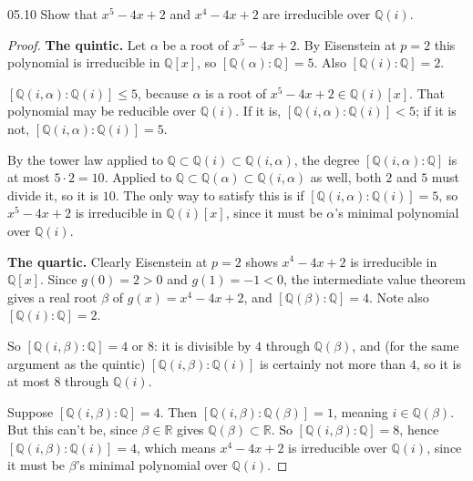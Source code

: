 \documentclass[11pt]{article}
\begin{document}
\begin{problem}{05.10}
  Show that $x^5 - 4x + 2$ and $x^4 - 4x + 2$ are irreducible over
  $\mathbb{Q}(i)$.
\end{problem}
\begin{proof}
\textbf{The quintic.} Let $\alpha$ be a root of $x^5 - 4x + 2$. By
Eisenstein at $p = 2$ this polynomial is irreducible in $\mathbb{Q}[x]$,
so $[\mathbb{Q}(\alpha) : \mathbb{Q}] = 5$. Also
$[\mathbb{Q}(i) : \mathbb{Q}] = 2$.

$[\mathbb{Q}(i,\alpha) : \mathbb{Q}(i)] \le 5$, because $\alpha$ is a root
of $x^5 - 4x + 2 \in \mathbb{Q}(i)[x]$. That polynomial may be reducible
over $\mathbb{Q}(i)$. If it is, $[\mathbb{Q}(i,\alpha) : \mathbb{Q}(i)] < 5$;
if it is not, $[\mathbb{Q}(i,\alpha) : \mathbb{Q}(i)] = 5$.

By the tower law applied to
$\mathbb{Q} \subset \mathbb{Q}(i) \subset \mathbb{Q}(i,\alpha)$, the degree
$[\mathbb{Q}(i,\alpha) : \mathbb{Q}]$ is at most $5 \cdot 2 = 10$. Applied to
$\mathbb{Q} \subset \mathbb{Q}(\alpha) \subset \mathbb{Q}(i,\alpha)$ as well,
both $2$ and $5$ must divide it, so it is $10$. The only way to satisfy
this is if $[\mathbb{Q}(i,\alpha) : \mathbb{Q}(i)] = 5$, so
$x^5 - 4x + 2$ is irreducible in $\mathbb{Q}(i)[x]$, since it must be
$\alpha$'s minimal polynomial over $\mathbb{Q}(i)$.

\textbf{The quartic.} Clearly Eisenstein at $p = 2$ shows $x^4 - 4x + 2$ is
irreducible in $\mathbb{Q}[x]$. Since $g(0) = 2 > 0$ and $g(1) = -1 < 0$,
the intermediate value theorem gives a real root $\beta$ of
$g(x) = x^4 - 4x + 2$, and $[\mathbb{Q}(\beta) : \mathbb{Q}] = 4$. Note also
$[\mathbb{Q}(i) : \mathbb{Q}] = 2$.

So $[\mathbb{Q}(i,\beta) : \mathbb{Q}] = 4$ or $8$: it is divisible by $4$
through $\mathbb{Q}(\beta)$, and (for the same argument as the quintic)
$[\mathbb{Q}(i,\beta) : \mathbb{Q}(i)]$ is certainly not more than $4$, so it
is at most $8$ through $\mathbb{Q}(i)$.

Suppose $[\mathbb{Q}(i,\beta) : \mathbb{Q}] = 4$. Then
$[\mathbb{Q}(i,\beta) : \mathbb{Q}(\beta)] = 1$, meaning
$i \in \mathbb{Q}(\beta)$. But this can't be, since $\beta \in \mathbb{R}$
gives $\mathbb{Q}(\beta) \subset \mathbb{R}$. So
$[\mathbb{Q}(i,\beta) : \mathbb{Q}] = 8$, hence
$[\mathbb{Q}(i,\beta) : \mathbb{Q}(i)] = 4$, which means $x^4 - 4x + 2$ is
irreducible over $\mathbb{Q}(i)$, since it must be $\beta$'s minimal
polynomial over $\mathbb{Q}(i)$.
\end{proof}
\end{document}
